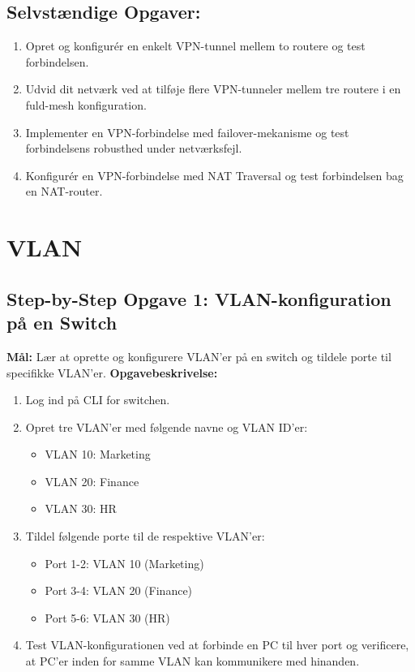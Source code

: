 \subsection*{Selvstændige Opgaver:}
\begin{enumerate}
	\item Opret og konfigurér en enkelt VPN-tunnel mellem to routere og test forbindelsen.
	\item Udvid dit netværk ved at tilføje flere VPN-tunneler mellem tre routere i en fuld-mesh konfiguration.
	\item Implementer en VPN-forbindelse med failover-mekanisme og test forbindelsens robusthed under netværksfejl.
	\item Konfigurér en VPN-forbindelse med NAT Traversal og test forbindelsen bag en NAT-router.
\end{enumerate}

\section{VLAN}
\subsection*{Step-by-Step Opgave 1: VLAN-konfiguration på en Switch}
\textbf{Mål:} Lær at oprette og konfigurere VLAN'er på en switch og tildele porte til specifikke VLAN'er.
\newline\newline\noindent
\textbf{Opgavebeskrivelse:}
\begin{enumerate}
	\item Log ind på CLI for switchen.
	\item Opret tre VLAN'er med følgende navne og VLAN ID'er:
	\begin{itemize}
		\item VLAN 10: Marketing
		\item VLAN 20: Finance
		\item VLAN 30: HR
	\end{itemize}
	\item Tildel følgende porte til de respektive VLAN'er:
	\begin{itemize}
		\item Port 1-2: VLAN 10 (Marketing)
		\item Port 3-4: VLAN 20 (Finance)
		\item Port 5-6: VLAN 30 (HR)
	\end{itemize}
	\item Test VLAN-konfigurationen ved at forbinde en PC til hver port og verificere, at PC'er inden for samme VLAN kan kommunikere med hinanden.
\end{enumerate}

